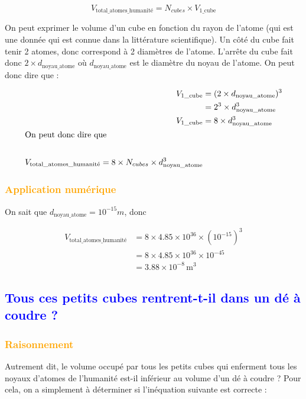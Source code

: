 \documentclass[a4paper,12pt]{article}
\begin{document}
\[
V_{\text{total\_atomes\_humanité}} = N_{cubes} \times V_{\text{1\_cube}}
\]

On peut exprimer le volume d'un cube en fonction du rayon de l'atome (qui est une donnée qui est connue dans la littérature scientifique). Un côté du cube fait tenir 2 atomes, donc correspond à 2 diamètres de l'atome.
L'arrête du cube fait donc $2 \times d_{\text{noyau\_atome}}$ où $d_{\text{noyau\_atome}}$ est le diamètre du noyau de l'atome. On peut donc dire que : 

\begin{align*}
  V_{\text{1\_cube}} &= (2 \times d_{\text{noyau\_atome}})^3 \\
                     &= 2^3 \times d_{\text{noyau\_atome}}^3 \\
  V_{\text{1\_cube}} &= 8 \times d_{\text{noyau\_atome}}^3 \\ 
  \intertext{On peut donc dire que} \\
  V_{\text{total\_atomes\_humanité}} = 8 \times N_{cubes} \times d_{\text{noyau\_atome}}^3
\end{align*}

\subsubsection*{\textcolor{orange}{Application numérique}}

On sait que $d_{\text{noyau\_atome}} = 10^{-15} m$, donc 

\begin{align*}
  V_{\text{total\_atomes\_humanité}} &= 8 \times 4.85 \times 10^{36} \times \left(10^{-15}\right)^3  \\
  &= 8 \times 4.85 \times 10^{36} \times 10^{-45} \\
  &= 3.88 \times 10^{-8} \, \text{m}^3
\end{align*}

\subsection{\textcolor{blue}{Tous ces petits cubes rentrent-t-il dans un dé à coudre ?}}

\subsubsection*{\textcolor{orange}{Raisonnement}}

Autrement dit, le volume occupé par tous les petits cubes qui enferment tous les noyaux d'atomes de l'humanité est-il inférieur au volume d'un dé à coudre ?
Pour cela, on a simplement à déterminer si l'inéquation suivante est correcte : 
\end{document}
